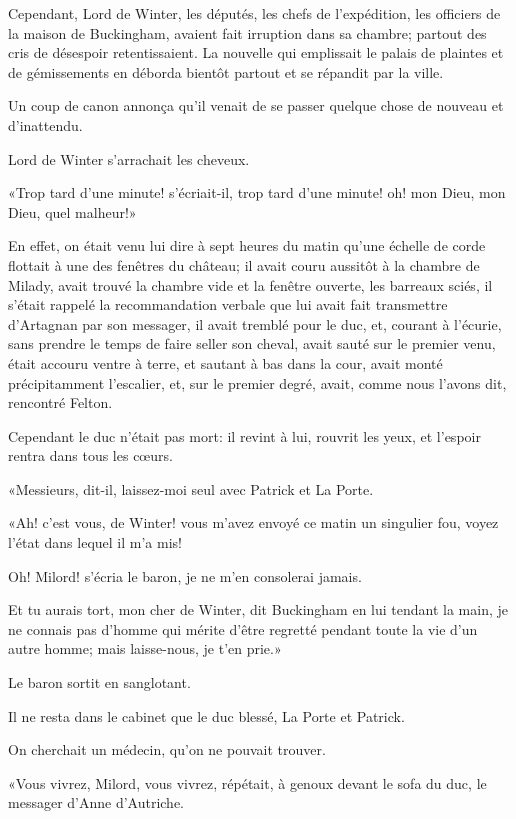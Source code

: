 Cependant, Lord de Winter, les députés, les chefs de l'expédition, les officiers de la maison de Buckingham, avaient fait irruption dans sa chambre; partout des cris de désespoir retentissaient. La nouvelle qui emplissait le palais de plaintes et de gémissements en déborda bientôt partout et se répandit par la ville. 

Un coup de canon annonça qu'il venait de se passer quelque chose de nouveau et d'inattendu. 

Lord de Winter s'arrachait les cheveux. 

«Trop tard d'une minute! s'écriait-il, trop tard d'une minute! oh! mon Dieu, mon Dieu, quel malheur!» 

En effet, on était venu lui dire à sept heures du matin qu'une échelle de corde flottait à une des fenêtres du château; il avait couru aussitôt à la chambre de Milady, avait trouvé la chambre vide et la fenêtre ouverte, les barreaux sciés, il s'était rappelé la recommandation verbale que lui avait fait transmettre d'Artagnan par son messager, il avait tremblé pour le duc, et, courant à l'écurie, sans prendre le temps de faire seller son cheval, avait sauté sur le premier venu, était accouru ventre à terre, et sautant à bas dans la cour, avait monté précipitamment l'escalier, et, sur le premier degré, avait, comme nous l'avons dit, rencontré Felton. 

Cependant le duc n'était pas mort: il revint à lui, rouvrit les yeux, et l'espoir rentra dans tous les cœurs. 

«Messieurs, dit-il, laissez-moi seul avec Patrick et La Porte. 

«Ah! c'est vous, de Winter! vous m'avez envoyé ce matin un singulier fou, voyez l'état dans lequel il m'a mis! 

\speak  Oh! Milord! s'écria le baron, je ne m'en consolerai jamais. 

\speak  Et tu aurais tort, mon cher de Winter, dit Buckingham en lui tendant la main, je ne connais pas d'homme qui mérite d'être regretté pendant toute la vie d'un autre homme; mais laisse-nous, je t'en prie.» 

Le baron sortit en sanglotant. 

Il ne resta dans le cabinet que le duc blessé, La Porte et Patrick. 

On cherchait un médecin, qu'on ne pouvait trouver. 

«Vous vivrez, Milord, vous vivrez, répétait, à genoux devant le sofa du duc, le messager d'Anne d'Autriche. 

